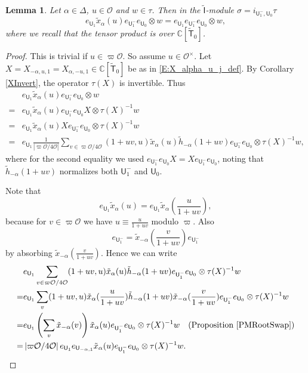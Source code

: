 \documentclass[10pt, letterpaper]{amsart}
\theoremstyle{plain}
\newtheorem{Lem}[equation]{Lemma}
\theoremstyle{definition}
\numberwithin{equation}{section}
\newcommand{\C}{\mathbb{C}}
\newcommand{\xt}{\tilde{x}}
\newcommand{\htt}{\tilde{h}}
\newcommand{\Ocal}{\mathcal{O}}
\newcommand{\If}{\mathsf{I}}
\newcommand{\Uf}{\mathsf{U}}
\newcommand{\Tft}{\widetilde{\mathsf{T}}}
\begin{document}
\begin{Lem}\label{LemVarIndRootMove2}
	Let $\alpha\in\Delta$, $u\in\mathcal{O}$ and $w\in \tau$. Then in the $\widetilde{{\If}}$-module $\sigma=i_{{\Uf}_{1}^{-},{\Uf}_{0}}\tau$
	\begin{equation*}
		e_{{\Uf}_{1}}\xt_{\alpha}(u)e_{{\Uf}_{1}^{-}}e_{{\Uf}_{0}}\otimes w = e_{{\Uf}_{1}}e_{{\Uf}_{1}^{-}}e_{{\Uf}_{0}}\otimes w,
	\end{equation*}
    where we recall that the tensor product is over $\C[\Tft_0]$.
\end{Lem}
\begin{proof}
        This is trivial if $u\in\varpi\mathcal{O}$. So assume $u\in\mathcal{O}^{\times}$. Let $X=X_{-\alpha,u,1}=X_{\alpha, -u, 1}\in\mathbb{C}[\Tft_{0}]$ be as in \eqref{E:X_alpha_u_j_def}. By Corollary \ref{XInvert}, the operator $\tau(X)$ is invertible. Thus
	\begin{align*}
		&e_{{\Uf}_{1}}\xt_{\alpha}(u)e_{{\Uf}_{1}^{-}}e_{{\Uf}_{0}}\otimes w\\
        = & e_{{\Uf}_{1}}\xt_{\alpha}(u)e_{{\Uf}_{1}^{-}}e_{{\Uf}_{0}}X\otimes \tau(X)^{-1}w\\
        = & e_{{\Uf}_{1}}\xt_{\alpha}(u)Xe_{{\Uf}_{1}^{-}}e_{{\Uf}_{0}}\otimes \tau(X)^{-1}w\\
		= & e_{{\Uf}_{1}}\frac{1}{\left|\varpi\Ocal\slash 4\Ocal\right|}\sum_{v\in \varpi\Ocal/4\Ocal}(1+uv,u)\xt_{\alpha}(u)\htt_{-\alpha}(1+uv)e_{{\Uf}_{1}^{-}}e_{{\Uf}_{0}}\otimes \tau(X)^{-1}w,
	\end{align*}
    where for the second equality we used $e_{{\Uf}_{1}^{-}}e_{{\Uf}_{0}}X=Xe_{{\Uf}_{1}^{-}}e_{{\Uf}_{0}}$, noting that $\htt_{-\alpha}(1+uv)$ normalizes both $\Uf_1^-$ and $\Uf_0$. 
    
    Note that
    \[
     e_{\Uf_1}\xt_{\alpha}(u)=e_{\Uf_1}\xt_{\alpha}(\frac{u}{1+uv}),
    \]
    because for $v\in\varpi\Ocal$ we have $u\equiv \frac{u}{1+uv}$ modulo $\varpi$. Also
    \[
    e_{{\Uf}_{1}^{-}}=\xt_{-\alpha}(\frac{v}{1+uv})e_{{\Uf}_{1}^{-}}
    \]
    by absorbing $\xt_{-\alpha}(\frac{v}{1+uv})$. Hence we can write
	\begin{align*}
		&e_{{\Uf}_{1}}\sum_{v\in \varpi\Ocal/4\Ocal}(1+uv,u)\xt_{\alpha}(u)\htt_{-\alpha}(1+uv)e_{{\Uf}_{1}^{-}}e_{{\Uf}_{0}}\otimes \tau(X)^{-1}w \\
		= & e_{{\Uf}_{1}}\sum_{v}(1+uv,u)\xt_{\alpha}(\frac{u}{1+uv})\htt_{-\alpha}(1+uv)\xt_{-\alpha}(\frac{v}{1+uv})e_{{\Uf}_{1}^{-}}e_{{\Uf}_{0}}\otimes \tau(X)^{-1}w\\
        = & e_{{\Uf}_{1}}\left(\sum_{v}\xt_{-\alpha}(v)\right)\xt_{\alpha}(u)e_{{\Uf}_{1}^{-}}e_{{\Uf}_{0}}\otimes \tau(X)^{-1}w\quad (\text{Proposition \ref{PMRootSwap}})\\
		= & \left|\varpi\Ocal\slash 4\Ocal\right|e_{{\Uf}_{1}}e_{{\Uf}_{-\alpha,1}}\xt_{\alpha}(u)e_{{\Uf}_{1}^{-}}e_{{\Uf}_{0}}\otimes \tau(X)^{-1}w.
	\end{align*}
	

\end{proof}
\end{document}
